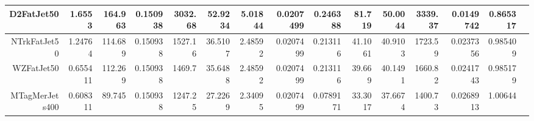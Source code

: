 \begin{table}[ht!]
\begin{center}
{\begin{tabular}{ r ||  r  r  r  r  r  r  r  r  r  || r r r r r |}
D2FatJet50 & 1.6553 & 164.963 & 0.150938 & 3032.68 & 52.9234 & 5.01844 & 0.0207499 & 0.246388 & 81.719 & 50.0044 & 3339.37&0.0149742 & 0.865317\tabularnewline \hline
NTrkFatJet50 & 1.24764 & 114.689 & 0.150938 & 1527.16 & 36.5107 & 2.48592 & 0.0207499 & 0.213116 & 41.1061 & 40.9103 &1723.59&0.0237356 & 0.985409\tabularnewline \hline
WZFatJet50 & 0.655411 & 112.269 & 0.150938 & 1469.7 & 35.6488 & 2.48592 & 0.0207499 & 0.213116 & 39.669 & 40.1491 &1660.82&0.0241743 & 0.985179\tabularnewline \hline
MTagMerJets400 & 0.608311 & 89.745 & 0.150938 & 1247.25 & 27.2269 & 2.34095 & 0.0207499 & 0.0789171 & 33.3017 & 37.6674 &1400.73&0.0268913 & 1.00644\tabularnewline \hline
\end{tabular}

}
\end{center}
\end{table}
